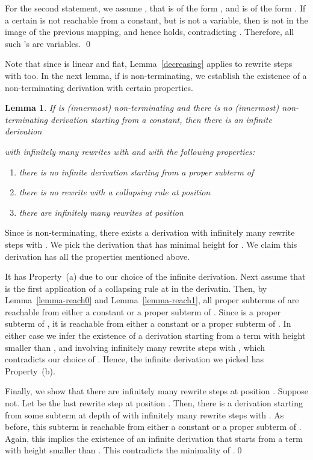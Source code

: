 \documentclass{LMCS}
\theoremstyle{plain}
\newtheorem{lemma}[thm]{Lemma}
\begin{document}
For the second statement,
we assume , that
 is of the form , and  is
of the form . If a certain  is not
reachable from a constant, but  is not a variable, then
 is not in the image of the previous mapping, and hence
 holds, contradicting .
Therefore, all such 's are variables.  \qed


Note that since  is linear and flat, Lemma~\ref{decreasing}
applies to rewrite steps with  too.
In the next lemma, if  is non-terminating,
we establish the existence of 
a non-terminating derivation with certain properties.

\begin{lemma}\label{lemma-main-aux}
If  is (innermost) non-terminating  and
there is no (innermost) non-terminating derivation starting
from a constant, then there is an infinite derivation

with infinitely many rewrites with  and
with the following properties:
\begin{enumerate}[\em(a)]
\item there is no infinite derivation starting from a proper
subterm of 

\item there is no rewrite with a collapsing rule at position 

\item there are infinitely many rewrites at position 
\end{enumerate}
\end{lemma}
\proof
Since  is non-terminating,
there exists a
derivation 
with infinitely many rewrite steps with .
We pick the derivation that has minimal height for .
We claim this derivation has all the properties mentioned above.

It has Property~(a) due to our choice of the infinite derivation.
Next assume that 
 is the first 
application of a collapsing rule at  in the derivatin.
Then,
by Lemma~\ref{lemma-reach0} and
Lemma~\ref{lemma-reach1}, all proper subterms of  are reachable from either a constant or
a proper subterm of . Since  is a proper subterm
of , it is reachable from either a constant or
a proper subterm of . In either case we infer the existence of
a derivation starting from a term with height smaller
than , and involving infinitely many rewrite steps with ,
which contradicts our choice of .
Hence, the infinite derivation we picked has Property~(b).

Finally, we show that 
there are infinitely many rewrite steps at position .
Suppose not. Let 
be the last rewrite step at position . Then, 
there is a derivation starting from
some subterm at depth  of  with infinitely many
rewrite steps with .
As before, this subterm is reachable
from either a constant or a proper subterm of .
Again, this implies the existence of an infinite derivation
that starts from a term with height smaller than .
This contradicts the minimality of .\qed
\end{document}
